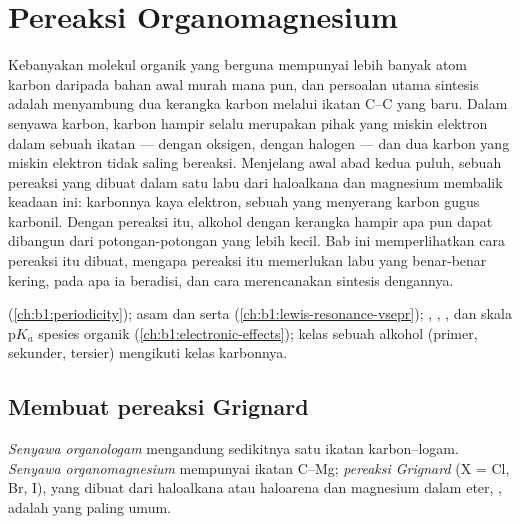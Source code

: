 \chapter{Pereaksi Organomagnesium}\label{ch:b1:organomagnesium}

Kebanyakan molekul organik yang berguna mempunyai lebih banyak atom
karbon daripada bahan awal murah mana pun, dan persoalan utama sintesis
adalah menyambung dua kerangka karbon melalui ikatan C--C yang baru.
Dalam senyawa karbon, karbon hampir selalu merupakan pihak yang miskin
elektron dalam sebuah ikatan --- dengan oksigen, dengan halogen --- dan
dua karbon yang miskin elektron tidak saling bereaksi. Menjelang awal
abad kedua puluh, sebuah pereaksi yang dibuat dalam satu labu dari
haloalkana dan magnesium membalik keadaan ini: karbonnya kaya elektron,
sebuah  yang menyerang karbon gugus karbonil. Dengan pereaksi
itu, alkohol dengan kerangka hampir apa pun dapat dibangun dari
potongan-potongan yang lebih kecil. Bab ini memperlihatkan cara pereaksi
itu dibuat, mengapa pereaksi itu memerlukan labu yang benar-benar
kering, pada apa ia beradisi, dan cara merencanakan sintesis dengannya.

\begin{recall}
 (\cref{ch:b1:periodicity}); asam dan  serta
 (\cref{ch:b1:lewis-resonance-vsepr}); , ,
, dan skala $\mathrm{p}K_a$ spesies organik
(\cref{ch:b1:electronic-effects}); kelas sebuah alkohol (primer,
sekunder, tersier) mengikuti kelas karbonnya.
\end{recall}

\section{Membuat pereaksi Grignard}

\begin{definition}\label{def:b1:organomagnesium:organometallic}
\emph{Senyawa organologam} mengandung
sedikitnya satu ikatan karbon--logam. \emph{Senyawa
organomagnesium} mempunyai ikatan C--Mg;
\emph{pereaksi Grignard}  (X = Cl, Br,
I), yang dibuat dari haloalkana atau haloarena dan magnesium dalam eter,
, adalah yang paling umum.
\end{definition}

